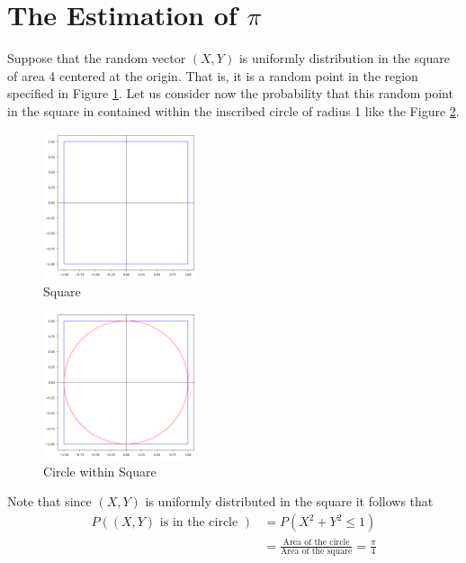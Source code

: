 \section{The Estimation of $\pi$}
Suppose that the random vector $(X,Y)$ is uniformly distribution in the square of area 4
centered at the origin. That is, it is a random point in the region specified in Figure \ref{Square}.
Let us consider now the probability that this random point in the square in contained within the inscribed circle of radius 1
like the Figure \ref{Circle within Square}.

\begin{figure}[H]
	\centering
	\includegraphics[width=0.4\textwidth]{images/square.png}
	\caption{Square}
	\label{Square}
\end{figure}

\begin{figure}[H]
	\centering
	\includegraphics[width=0.4\textwidth]{images/circle.png}
	\caption{Circle within Square}
	\label{Circle within Square}
\end{figure}

Note that since $(X,Y)$ is uniformly distributed in the square it follows that
\begin{align*}
	P((X,Y) \text{ is in the circle } ) & = P(X ^{2}+ Y ^{2}\le 1)                                                        \\
	                                    & = \frac{\text{Area of the circle} }{\text{Area of the square} } = \frac{\pi}{4}
\end{align*}


